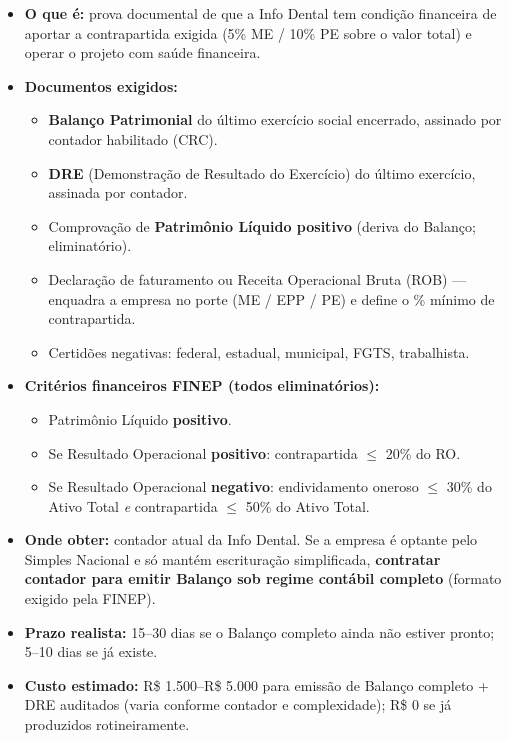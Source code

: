\documentclass[11pt, a4paper]{article}
\begin{document}
\begin{itemize}[label=\textcolor{primaryColor}{$\blacktriangleright$}, leftmargin=1.6em]
    \item \textbf{O que é:} prova documental de que a Info Dental tem condição financeira de aportar a contrapartida exigida (5\% ME / 10\% PE sobre o valor total) e operar o projeto com saúde financeira.
    \item \textbf{Documentos exigidos:}
    \begin{itemize}[label=$\circ$, leftmargin=1.4em]
        \item \textbf{Balanço Patrimonial} do último exercício social encerrado, assinado por contador habilitado (CRC).
        \item \textbf{DRE} (Demonstração de Resultado do Exercício) do último exercício, assinada por contador.
        \item Comprovação de \textbf{Patrimônio Líquido positivo} (deriva do Balanço; eliminatório).
        \item Declaração de faturamento ou Receita Operacional Bruta (ROB) --- enquadra a empresa no porte (ME / EPP / PE) e define o \% mínimo de contrapartida.
        \item Certidões negativas: federal, estadual, municipal, FGTS, trabalhista.
    \end{itemize}
    \item \textbf{Critérios financeiros FINEP (todos eliminatórios):}
    \begin{itemize}[label=$\circ$, leftmargin=1.4em]
        \item Patrimônio Líquido \textbf{positivo}.
        \item Se Resultado Operacional \textbf{positivo}: contrapartida $\leq$ 20\% do RO.
        \item Se Resultado Operacional \textbf{negativo}: endividamento oneroso $\leq$ 30\% do Ativo Total \emph{e} contrapartida $\leq$ 50\% do Ativo Total.
    \end{itemize}
    \item \textbf{Onde obter:} contador atual da Info Dental. Se a empresa é optante pelo Simples Nacional e só mantém escrituração simplificada, \textbf{contratar contador para emitir Balanço sob regime contábil completo} (formato exigido pela FINEP).
    \item \textbf{Prazo realista:} 15--30 dias se o Balanço completo ainda não estiver pronto; 5--10 dias se já existe.
    \item \textbf{Custo estimado:} R\$ 1.500--R\$ 5.000 para emissão de Balanço completo + DRE auditados (varia conforme contador e complexidade); R\$ 0 se já produzidos rotineiramente.

\end{itemize}
\end{document}
